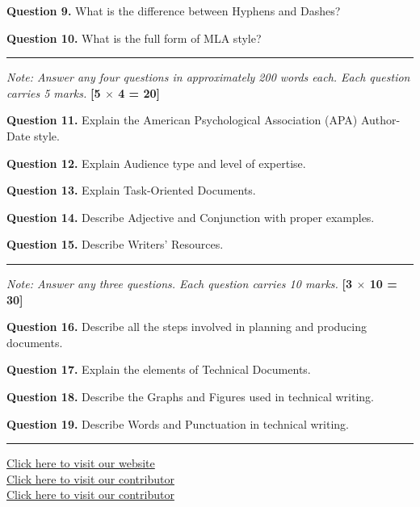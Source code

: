 \documentclass[11pt,a4paper]{article}
\begin{document}
\medskip


\noindent   \textbf{Question 9.} What is the difference between Hyphens and Dashes?

\medskip


\noindent   \textbf{Question 10.} What is the full form of MLA style?

\bigskip


\rule{\linewidth}{0.4pt}\smallskip




\noindent   \textit{Note: Answer any four questions in approximately 200 words each. Each question carries 5 marks.} \hfill   \textbf{[5 $ \times$ 4 = 20]}

\medskip


\noindent   \textbf{Question 11.} Explain the American Psychological Association (APA) Author-Date style.

\medskip


\noindent   \textbf{Question 12.} Explain Audience type and level of expertise.

\medskip


\noindent   \textbf{Question 13.} Explain Task-Oriented Documents.

\medskip


\noindent   \textbf{Question 14.} Describe Adjective and Conjunction with proper examples.

\medskip


\noindent   \textbf{Question 15.} Describe Writers' Resources.

\bigskip


\rule{\linewidth}{0.4pt}\smallskip




\noindent   \textit{Note: Answer any three questions. Each question carries 10 marks.} \hfill   \textbf{[3 $ \times$ 10 = 30]}

\medskip


\noindent   \textbf{Question 16.} Describe all the steps involved in planning and producing documents.

\medskip


\noindent   \textbf{Question 17.} Explain the elements of Technical Documents.

\medskip


\noindent   \textbf{Question 18.} Describe the Graphs and Figures used in technical writing.

\medskip


\noindent   \textbf{Question 19.} Describe Words and Punctuation in technical writing.

\vfill
\rule{\linewidth}{0.4pt}

\begin{center}\small
\href{https://bhu-exam.vercel.app/}{Click here to visit our website}\\[4pt]\href{https://me-aryan.vercel.app/}{Click here to visit our contributor}\\[4pt]\href{https://quashan-me.vercel.app/}{Click here to visit our contributor}
\end{center}
\end{document}

